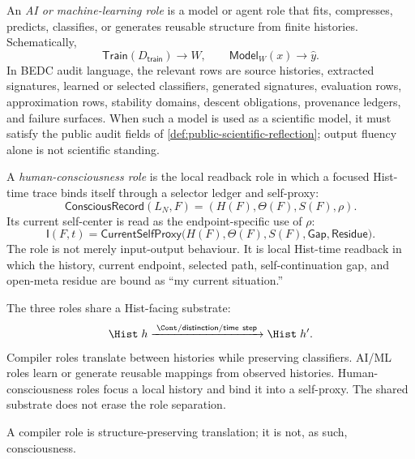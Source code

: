 \begin{definition}
\label{def:ai-ml-role-pattern-learning}
An \emph{AI or machine-learning role} is a model or agent role that fits,
compresses, predicts, classifies, or generates reusable structure from
finite histories. Schematically,
$$
\mathsf{Train}(D_{\mathsf{train}})\to W,
\qquad
\mathsf{Model}_{W}(x)\to \hat y.
$$
In BEDC audit language, the relevant rows are source histories, extracted
signatures, learned or selected classifiers, generated signatures,
evaluation rows, approximation rows, stability domains, descent
obligations, provenance ledgers, and failure surfaces. When such a model
is used as a scientific model, it must satisfy the public audit fields of
\autoref{def:public-scientific-reflection}; output fluency alone is not
scientific standing.
\end{definition}

\begin{definition}
\label{def:human-consciousness-role-self-proxy}
A \emph{human-consciousness role} is the local readback role in which a
focused Hist-time trace binds itself through a selector ledger and
self-proxy:
$$
\mathsf{ConsciousRecord}(L_N,F)
=
(H(F),\Theta(F),S(F),\rho).
$$
Its current self-center is read as the endpoint-specific use of $\rho$:
$$
\mathsf{I}(F,t)
=
\mathsf{CurrentSelfProxy}
\bigl(
H(F),
\Theta(F),
S(F),
\mathsf{Gap},
\mathsf{Residue}
\bigr).
$$
The role is not merely input-output behaviour. It is local Hist-time
readback in which the history, current endpoint, selected path,
self-continuation gap, and open-meta residue are bound as ``my current
situation.''
\end{definition}

\begin{definition}
\label{def:compiler-ai-consciousness-shared-substrate}
The three roles share a Hist-facing substrate:
$$
\Hist\;h
\xrightarrow{\;\Cont/\mathsf{distinction}/\mathsf{time\ step}\;}
\Hist\;h'.
$$
Compiler roles translate between histories while preserving classifiers.
AI/ML roles learn or generate reusable mappings from observed histories.
Human-consciousness roles focus a local history and bind it into a
self-proxy. The shared substrate does not erase the role separation.
\end{definition}

\begin{theorem}
\label{thm:compiler-preservation-not-consciousness}
A compiler role is structure-preserving translation; it is not, as such,
consciousness.
\end{theorem}


